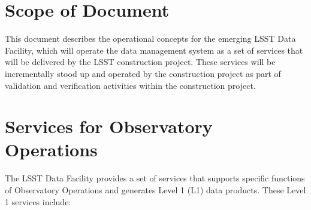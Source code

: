 \section{Scope of Document}

This document describes the operational concepts for the emerging LSST Data 
Facility, which will operate the data management system as a set of services 
that will be delivered by the LSST construction project. These services will be 
incrementally stood up and operated by the construction project as part of 
validation and verification activities within the construction project.

\section{Services for Observatory Operations}
The LSST Data Facility provides a set of services that supports specific 
functions of Observatory Operations and generates Level 1 (L1) data products. 
These Level 1 services include:

